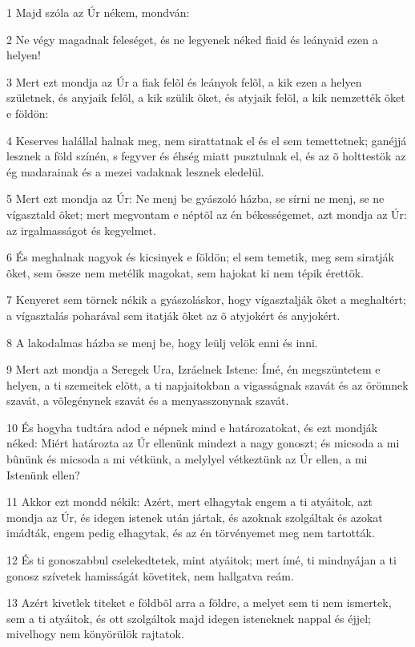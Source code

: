 \par 1 Majd szóla az Úr nékem, mondván:
\par 2 Ne végy magadnak feleséget, és ne legyenek néked fiaid és leányaid ezen a helyen!
\par 3 Mert ezt mondja az Úr a fiak felõl és leányok felõl, a kik ezen a helyen születnek, és anyjaik felõl, a kik szülik õket, és atyjaik felõl, a kik nemzették õket e földön:
\par 4 Keserves halállal halnak meg, nem sirattatnak el és el sem temettetnek; ganéjjá lesznek a föld színén, s fegyver és éhség miatt pusztulnak el, és az õ holttestök az ég madarainak és a mezei vadaknak lesznek eledelül.
\par 5 Mert ezt mondja az Úr: Ne menj be gyászoló házba, se sírni ne menj, se ne vígasztald õket; mert megvontam e néptõl az én békességemet, azt mondja az Úr: az irgalmasságot és kegyelmet.
\par 6 És meghalnak nagyok és kicsinyek e földön; el sem temetik, meg sem siratják õket, sem össze nem metélik magokat, sem hajokat ki nem tépik érettök.
\par 7 Kenyeret sem törnek nékik a gyászoláskor, hogy vígasztalják õket a meghaltért; a vígasztalás poharával sem itatják õket az õ atyjokért és anyjokért.
\par 8 A lakodalmas házba se menj be, hogy leülj velök enni és inni.
\par 9 Mert azt mondja a Seregek Ura, Izráelnek Istene: Ímé, én megszüntetem e helyen, a ti szemeitek elõtt, a ti napjaitokban a vigasságnak szavát és az örömnek szavát, a võlegénynek szavát és a menyasszonynak szavát.
\par 10 És hogyha tudtára adod e népnek mind e határozatokat, és ezt mondják néked: Miért határozta az Úr ellenünk mindezt a nagy gonoszt; és micsoda a mi bûnünk és micsoda a mi vétkünk, a melylyel vétkeztünk az Úr ellen, a mi Istenünk ellen?
\par 11 Akkor ezt mondd nékik: Azért, mert elhagytak engem a ti atyáitok, azt mondja az Úr, és idegen istenek után jártak, és azoknak szolgáltak és azokat imádták, engem pedig elhagytak, és az én törvényemet meg nem tartották.
\par 12 És ti gonoszabbul cselekedtetek, mint atyáitok; mert ímé, ti mindnyájan a ti gonosz szívetek hamisságát követitek, nem hallgatva reám.
\par 13 Azért kivetlek titeket e földbõl arra a földre, a melyet sem ti nem ismertek, sem a ti atyáitok, és ott szolgáltok majd idegen isteneknek nappal és éjjel; mivelhogy nem könyörülök rajtatok.
